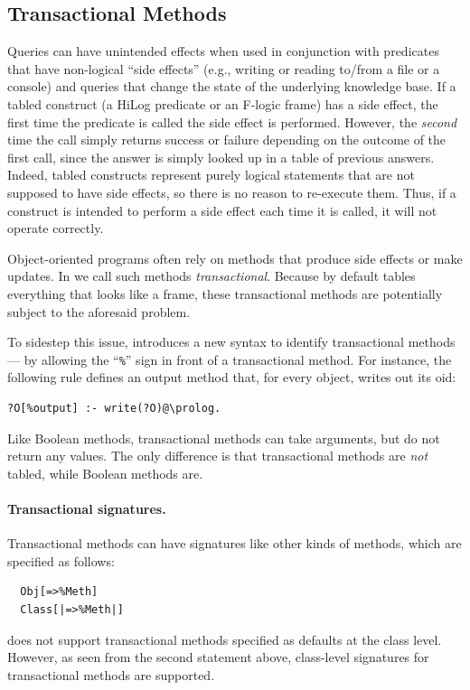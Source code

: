 \documentclass[11pt]{article}
\newcommand{\ERGO}{\mbox{\smaller{\ensuremath{\cal{E}}\smaller{{\sc{RGO}}}}}\xspace}
\newcommand{\FLSYSTEM}{\ERGO}
\begin{document}
\subsection{Transactional Methods}\label{sec-proc-methods}

%
Queries can
have unintended effects when used in conjunction with
predicates that have non-logical ``side effects''
(e.g., writing or reading to/from a file or a console) and queries that change the state of
the underlying knowledge base.  If a tabled construct (a HiLog predicate
or an F-logic frame)
has a side effect, the first time the
predicate is called the side effect is performed. However, the \emph{second} time the
call simply returns success or failure depending on the outcome of
the first call, since the answer is simply looked
up in a table of previous answers. Indeed, tabled constructs represent
purely logical statements that are not supposed to have side effects, so
there is no reason to re-execute them.
Thus, if a \FLSYSTEM construct
is intended to perform a side effect each time it is
called, it will not operate correctly.

Object-oriented programs often rely on methods that produce side effects
or make updates.  In \FLSYSTEM we call such methods 
\emph{transactional}.
Because by default \FLSYSTEM tables everything that looks like a frame,
these transactional methods are potentially subject to the aforesaid problem.

To sidestep this issue, \FLSYSTEM introduces a new syntax to identify
transactional methods --- by allowing the ``\verb|%|'' sign in front of a
transactional method. For instance, the following rule defines an output
method that, for every object, writes out its oid:
\begin{verbatim}
?O[%output] :- write(?O)@\prolog.
\end{verbatim}
Like Boolean methods, transactional methods can take arguments, but do not
return any values.  The only difference is that transactional methods are
\emph{not} tabled, while Boolean methods are.

\paragraph{Transactional signatures.}
Transactional methods can have signatures like other kinds of methods, which
are specified as follows:
\begin{verbatim}
  Obj[=>%Meth]
  Class[|=>%Meth|]
\end{verbatim}
\FLSYSTEM does not support transactional methods specified as defaults at the
class level. However, as seen from the second statement above, class-level
signatures for transactional methods are supported.
\begin{verbatim}
\end{verbatim}
\end{document}
